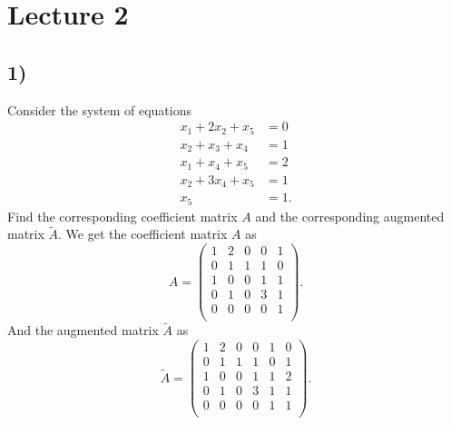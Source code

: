 \section*{Lecture 2}

\subsection*{1)}
Consider the system of equations
\begin{align*}
  x_1 + 2x_2 + x_5 &= 0 \\
  x_2 + x_3 + x_4 &= 1 \\
  x_1 + x_4 + x_5 &= 2 \\
  x_2 + 3x_4 + x_5 &= 1 \\
  x_5 &= 1
.\end{align*}
Find the corresponding coefficient matrix $A$ and the corresponding augmented matrix $\tilde{A}$.
\bigbreak
We get the coefficient matrix $A$ as
\[ 
A = \begin{pmatrix}
1 & 2 & 0 & 0 & 1\\
0 & 1 & 1 & 1 & 0\\
1 & 0 & 0 & 1 & 1\\
0 & 1 & 0 & 3 & 1\\
0 & 0 & 0 & 0 & 1\\
\end{pmatrix}
.\]
And the augmented matrix $\tilde{A}$ as
\[ 
  \tilde{A} = \left( \begin{array}{ccccc|c}
  1 & 2 & 0 & 0 & 1 & 0\\
  0 & 1 & 1 & 1 & 0 & 1\\
  1 & 0 & 0 & 1 & 1 & 2\\
  0 & 1 & 0 & 3 & 1 & 1\\
  0 & 0 & 0 & 0 & 1 & 1\\
  \end{array} \right)
.\]



